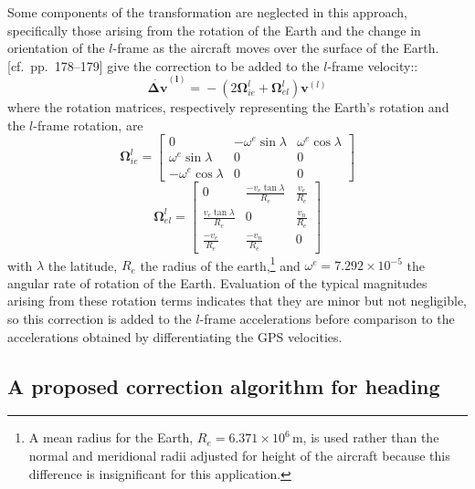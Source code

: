 \documentclass[english,british,amt,bookmarks=false,unicode=true]{copernicus}\usepackage[]{graphicx}\usepackage[]{color}
\begin{document}
Some components of the transformation are neglected in this approach,
specifically those arising from the rotation of the Earth and the
change in orientation of the $l$-frame as the aircraft moves over
the surface of the Earth. \citet{noureldin2013fundamentals} {[}cf.~pp.~178--179{]}
give the correction to be added to the $l$-frame velocity::\\
\begin{equation}
\mathbf{\dot{\Delta v}^{(l)}=}-(2\boldsymbol{\Omega}_{ie}^{l}+\boldsymbol{\Omega}_{el}^{l})\mathbf{v}^{(l)}\label{eq:rotation-correction}
\end{equation}
where the rotation matrices, respectively representing the Earth's
rotation and the $l$-frame rotation, are\\
\begin{equation}
\boldsymbol{\Omega}_{ie}^{l}=\left[\begin{array}{ccc}
0 & -\omega^{e}\sin\lambda & \omega^{e}\cos\lambda\\
\omega^{e}\sin\lambda & 0 & 0\\
-\omega^{e}\cos\lambda & 0 & 0
\end{array}\right]\label{eq:first-omega-eq}
\end{equation}
\begin{equation}
\boldsymbol{\Omega}_{el}^{l}=\left[\begin{array}{ccc}
0 & \frac{-v_{e}\tan\lambda}{R_{e}} & \frac{v_{e}}{R_{e}}\\
\frac{v_{e}\tan\lambda}{R_{e}} & 0 & \frac{v_{n}}{R_{e}}\\
\frac{-v_{e}}{R_{e}} & \frac{-v_{n}}{R_{e}} & 0
\end{array}\right]\label{eq:second-omega-equation}
\end{equation}
with $\lambda$ the latitude, $R_{e}$ the radius of the earth,\footnote{A mean radius for the Earth, $R_{e}=6.371\times10^{6}$\,m, is used
rather than the normal and meridional radii adjusted for height of
the aircraft because this difference is insignificant for this application.} and $\omega^{e}=7.292\times10^{-5}$ the angular rate of rotation
of the Earth. Evaluation of the typical magnitudes arising from these
rotation terms indicates that they are minor but not negligible, so
this correction is added to the $l$-frame accelerations before comparison
to the accelerations obtained by differentiating the GPS velocities.


\subsection{A proposed correction algorithm for heading}
\end{document}
